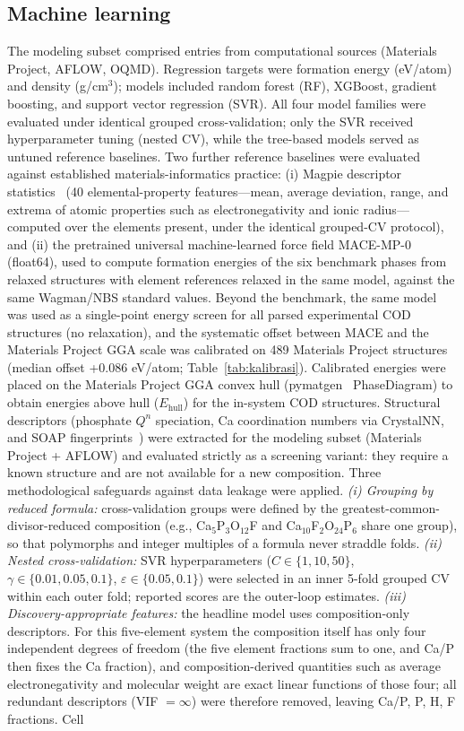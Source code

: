 \documentclass[review,11pt,a4paper]{elsarticle}
\begin{document}
\subsection{Machine learning}
The modeling subset comprised entries from computational sources (Materials Project, AFLOW, OQMD). Regression targets were formation energy (eV/atom) and density (g/cm$^3$); models included random forest (RF), XGBoost, gradient boosting, and support vector regression (SVR). All four model families were evaluated under identical grouped cross-validation; only the SVR received hyperparameter tuning (nested CV), while the tree-based models served as untuned reference baselines. Two further reference baselines were evaluated against established materials-informatics practice: (i) Magpie descriptor statistics~\cite{ward2016} (40 elemental-property features---mean, average deviation, range, and extrema of atomic properties such as electronegativity and ionic radius---computed over the elements present, under the identical grouped-CV protocol), and (ii) the pretrained universal machine-learned force field MACE-MP-0~\cite{batatia2022} (float64), used to compute formation energies of the six benchmark phases from relaxed structures with element references relaxed in the same model, against the same Wagman/NBS standard values. Beyond the benchmark, the same model was used as a single-point energy screen for all parsed experimental COD structures (no relaxation), and the systematic offset between MACE and the Materials Project GGA scale was calibrated on 489 Materials Project structures (median offset +0.086 eV/atom; Table~\ref{tab:kalibrasi}). Calibrated energies were placed on the Materials Project GGA convex hull (pymatgen~\cite{ong2013} PhaseDiagram) to obtain energies above hull ($E_\mathrm{hull}$) for the in-system COD structures. Structural descriptors (phosphate $Q^n$ speciation, Ca coordination numbers via CrystalNN, and SOAP fingerprints~\cite{himanen2020}) were extracted for the modeling subset (Materials Project + AFLOW) and evaluated strictly as a screening variant: they require a known structure and are not available for a new composition. Three methodological safeguards against data leakage were applied. \emph{(i) Grouping by reduced formula:} cross-validation groups were defined by the greatest-common-divisor-reduced composition (e.g., Ca$_5$P$_3$O$_{12}$F and Ca$_{10}$F$_2$O$_{24}$P$_6$ share one group), so that polymorphs and integer multiples of a formula never straddle folds. \emph{(ii) Nested cross-validation:} SVR hyperparameters ($C \in \{1,10,50\}$, $\gamma \in \{0.01,0.05,0.1\}$, $\varepsilon \in \{0.05,0.1\}$) were selected in an inner 5-fold grouped CV within each outer fold; reported scores are the outer-loop estimates. \emph{(iii) Discovery-appropriate features:} the headline model uses composition-only descriptors. For this five-element system the composition itself has only four independent degrees of freedom (the five element fractions sum to one, and Ca/P then fixes the Ca fraction), and composition-derived quantities such as average electronegativity and molecular weight are exact linear functions of those four; all redundant descriptors (VIF $= \infty$) were therefore removed, leaving {Ca/P, P, H, F fractions}. Cell 
\end{document}
